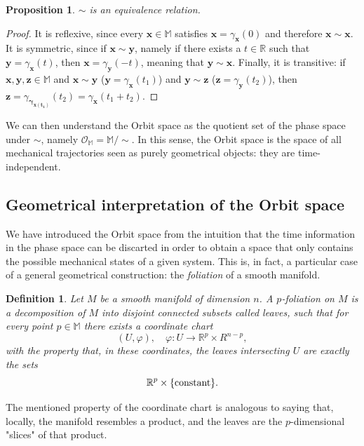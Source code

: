 \documentclass[12pt]{article}
\theoremstyle{plain}
\newtheorem{definition}{Definition}[section]
\newtheorem{proposition}{Proposition}[section]
\newcommand{\R}{\mathbb{R}}
\newcommand{\M}{\mathbb{M}}
\begin{document}
\begin{proposition}
    $\sim$ is an equivalence relation.
\end{proposition}
\begin{proof}
    It is reflexive, since every $\mathbf{x}\in\M$ satisfies $\mathbf{x} = \gamma_\mathbf{x}(0)$ and therefore $\mathbf{x}\sim\mathbf{x}$. It is symmetric, since if $\mathbf{x}\sim\mathbf{y}$, namely if there exists a $t\in\R$ such that $\mathbf{y} = \gamma_\mathbf{x}(t)$, then $\mathbf{x} = \gamma_{\mathbf{y}}(-t)$, meaning that $\mathbf{y}\sim\mathbf{x}$. Finally, it is transitive: if $\mathbf{x},\mathbf{y},\mathbf{z}\in\M$ and $\mathbf{x}\sim \mathbf{y}$ ($\mathbf{y} = \gamma_\mathbf{x}(t_1)$) and $\mathbf{y}\sim\mathbf{z}$ ($\mathbf{z} = \gamma_\mathbf{y}(t_2)$), then $\mathbf{z} = \gamma_\mathbf{\gamma_{\mathbf{x}(t_1)}}(t_2) = \gamma_\mathbf{x}(t_1 + t_2)$.
\end{proof}

We can then understand the Orbit space as the quotient set of the phase space under $\sim$, namely $\mathcal{O}_\M = \M/\sim$. In this sense, the Orbit space is the space of all mechanical trajectories seen as purely geometrical objects: they are time-independent.

\subsection{Geometrical interpretation of the Orbit space}

We have introduced the Orbit space from the intuition that the time information in the phase space can be discarted in order to obtain a space that only contains the possible mechanical states of a given system. This is, in fact, a particular case of a general geometrical construction: the \textit{foliation} of a smooth manifold.

\begin{definition}
    Let $M$ be a smooth manifold of dimension $n$. A $p$-\textup{foliation} on $M$ is a decomposition of $M$ into disjoint connected subsets called \textup{leaves}, such that for every point $p\in\M$ there exists a coordinate chart $$(U,\varphi),\quad \varphi\colon U\to \R^p\times R^{n-p},$$ with the property that, in these coordinates, the leaves intersecting $U$ are exactly the sets $$\R^p\times\{\textup{constant}\}.$$
\end{definition}

The mentioned property of the coordinate chart is analogous to saying that, locally, the manifold resembles a product, and the leaves are the $p$-dimensional "slices" of that product.\\
\end{document}
